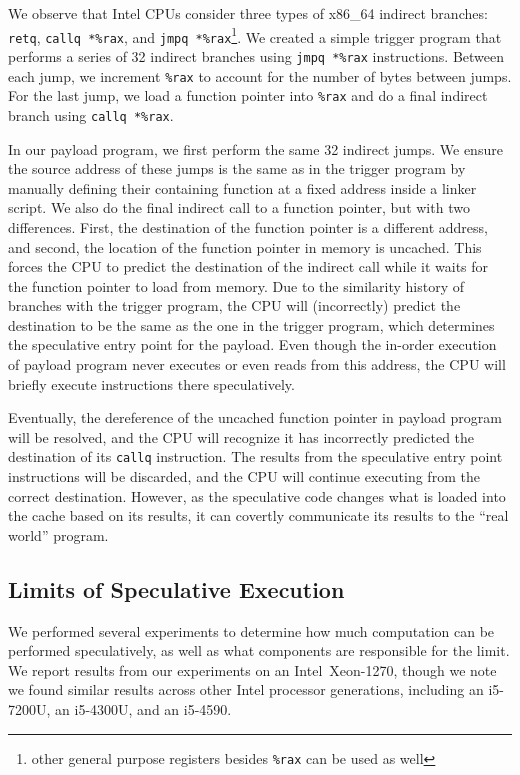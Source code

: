 We observe that Intel CPUs consider three types of x86\_64 indirect branches:
\texttt{retq}, \texttt{callq *\%rax}, and \texttt{jmpq *\%rax}\footnote{other
general purpose registers besides \texttt{\%rax} can be used as well}.
We created a simple trigger program that performs a series of 32 indirect
branches
using \texttt{jmpq *\%rax} instructions. Between each jump, we increment
\texttt{\%rax} to account for the number of bytes between jumps. For the last
jump, we load a function pointer into \texttt{\%rax} and do a final indirect
branch using \texttt{callq *\%rax}.

In our payload program, we first perform the same 32 indirect jumps. We ensure
the source address of these jumps is the same as in the trigger program by
manually defining their containing function at a fixed address inside a linker
script. We also do the final indirect call to a function pointer, but with two
differences. First, the destination of the function pointer is a different
address, and second, the location of the function pointer in memory is uncached.
This forces the CPU to predict the destination of the indirect call while it
waits for the function pointer to load from memory. Due to the similarity
history of branches with the trigger program,
the CPU will (incorrectly) predict the destination to be the same as the one in
the trigger program, which determines the speculative entry point for the
payload. Even though the in-order execution of
payload program never executes or even reads from this address, the CPU will
briefly execute instructions there speculatively.

Eventually, the dereference of the uncached function pointer in payload program
will be resolved, and the CPU will recognize it has incorrectly predicted the
destination of its \texttt{callq} instruction. The results from the speculative
entry point instructions will be discarded, and the CPU will continue executing
from the correct destination. However, as the speculative code changes what is
loaded into the cache based on its results, it can covertly communicate its
results to the ``real world'' program.



\subsection{Limits of Speculative Execution}

\FigSpecMeasure

We performed several experiments to determine how much computation can be
performed
speculatively, as well as what components are responsible for the limit.
We report results from our experiments on an Intel~Xeon-1270,
though we note we found similar results across other Intel processor generations,
including an i5-7200U, %
an i5-4300U, %
and an i5-4590. %




